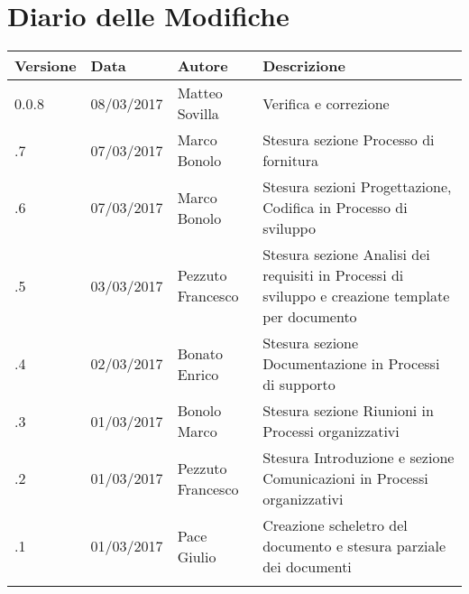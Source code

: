 \section*{Diario delle Modifiche}
\begin{longtabu} to \textwidth {
	X[4,l,p]
	X[4,l,p]
	X[4,l,p]
	X[8,l,p]}
	\toprule
		 Versione & Data & Autore & Descrizione \\
		\midrule
		\endhead
		
		0.0.8 & 08/03/2017 & Matteo Sovilla & Verifica e correzione\\
		\addlinespace[0.2em]
		\midrule
		.7 & 07/03/2017 & Marco Bonolo & Stesura sezione Processo di fornitura\\
		\addlinespace[0.2em]
		\midrule
		.6 & 07/03/2017 & Marco Bonolo & Stesura sezioni Progettazione, Codifica in Processo di sviluppo\\
		\addlinespace[0.2em]
		\midrule
		.5 & 03/03/2017 & Pezzuto Francesco & Stesura sezione Analisi dei requisiti in Processi di sviluppo e creazione template per documento\\
		\addlinespace[0.2em]
		\midrule
		.4 & 02/03/2017 & Bonato Enrico & Stesura sezione Documentazione in Processi di supporto\\
		\addlinespace[0.2em]
		\midrule
		.3 & 01/03/2017 & Bonolo Marco & Stesura sezione Riunioni in Processi organizzativi\\
		\addlinespace[0.2em]
		\midrule
		.2 & 01/03/2017 & Pezzuto Francesco & Stesura Introduzione e sezione Comunicazioni in Processi organizzativi\\
		\addlinespace[0.2em]
		\midrule
		.1 & 01/03/2017 & Pace Giulio & Creazione scheletro del documento e stesura parziale dei documenti\\
		\addlinespace[0.4em]
		
	\bottomrule
\end{longtabu}